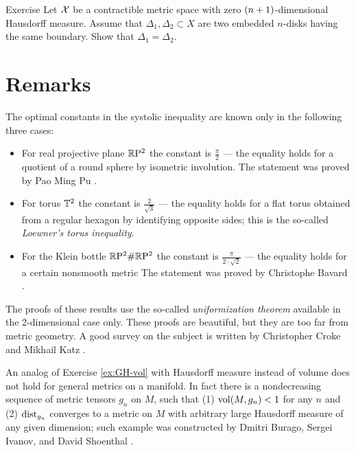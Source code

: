 \begin{thm}{Exercise}\label{ex:2top-discs}
Let $\mathcal{X}$ be a contractible metric space with zero $(n\z+1)$-dimensional Hausdorff measure.
Assume that $\Delta_1,\Delta_2\subset X$ are two embedded $n$-disks having the same boundary.
Show that $\Delta_1=\Delta_2$.
\end{thm}

\section{Remarks}

The optimal constants in the systolic inequality are known only in the following three cases:
\begin{itemize}
\item For real projective plane $\mathbb{R}\mathrm{P}^2$ the constant is $\tfrac\pi2$ --- the equality holds for a quotient of a round sphere by isometric involution. The statement was proved by Pao Ming Pu \cite{pu}.\label{page:pu}
\item For torus $\mathbb{T}^2$ the constant is $\tfrac2{\sqrt{3}}$ --- the equality holds for a flat torus obtained from a regular hexagon by identifying opposite sides; this is the so-called \emph{Loewner's torus inequality}.
\item For the Klein bottle $\mathbb{R}\mathrm{P}^2\#\mathbb{R}\mathrm{P}^2$  the constant is $\tfrac\pi{2\cdot\sqrt2}$ --- the equality holds for a certain nonsmooth metric The statement was proved by Christophe Bavard \cite{bavard}.
\end{itemize}
The proofs of these results use the so-called {}\emph{uniformization theorem}   available in the 2-dimensional case only.
These proofs are beautiful, but they are too far from metric geometry.
A good survey on the subject is written by Christopher Croke and Mikhail Katz \cite{croke-katz}.

An analog of Exercise \ref{ex:GH-vol} with Hausdorff measure instead of volume does not hold for general metrics on a manifold.
In fact there is a nondecreasing sequence of metric tensors $g_n$ on $M$, such that (1) $\operatorname{\rm vol}\nolimits(M,g_n)<1$ for any $n$ and (2) $\mathrm{dist}_{g_n}$ converges to a metric on $M$ with arbitrary large Hausdorff measure of any given dimension; such example was constructed by Dmitri Burago, Sergei Ivanov, and David Shoenthal \cite{burago-ivanov-shoenthal}.
